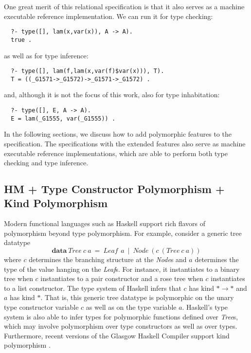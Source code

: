 \documentclass[runningheads,a4paper]{llncs}
\begin{document}
One great merit of this relational specification is that it also serves as
a machine executable reference implementation. We can run it
for type checking: {\small \vspace*{-1ex}
\begin{verbatim}
  ?- type([], lam(x,var(x)), A -> A).         
  true .
\end{verbatim} \vspace*{-.7ex} }\noindent
as well as for type inference: {\small \vspace*{-1ex}
\begin{verbatim}
  ?- type([], lam(f,lam(x,var(f)$var(x))), T).
  T = ((_G1571->_G1572)->_G1571->_G1572) .
\end{verbatim} \vspace*{-.7ex} }\noindent
and, although it is not the focus of this work,
also for type inhabitation: {\small \vspace*{-1ex}
\begin{verbatim}
  ?- type([], E, A -> A).
  E = lam(_G1555, var(_G1555)) .
\end{verbatim} \vspace*{-.7ex} }

In the following sections, we discuss how to add polymorphic features
to the specification. The specifications with the extended features
also serve as machine executable reference implementations, which
are able to perform both type checking and type inference.





\subsection{HM + Type Constructor Polymorphism + Kind Polymorphism}
\label{ssec:HMtck}
Modern functional languages such as Haskell support rich flavors of
polymorphism beyond type polymorphism. For example, consider
a generic tree datatype
\[ \textbf{data}~\textit{Tree}~c~a
  ~=~ \textit{Leaf}\,~a ~\mid~ \textit{Node}~(c~(\textit{Tree}~c~a)) \]
where $c$ determines the branching structure at the \textit{Node}s and $a$
determines the type of the value hanging on the \textit{Leaf}s. For instance,
it instantiates to a binary tree when $c$ instantiates to a pair constructor
and a rose tree when $c$ instantiates to a list constructor.
The type system of Haskell infers that $c$ has kind $*\to*$ and
$a$ has kind $*$. That is, this generic tree datatype is polymorphic on
the unary type constructor variable $c$ as well as on the type variable $a$.
Haskell's type system is also able to infer types for polymorphic functions
defined over \textit{Tree}s, which may involve polymorphism over
type constructors as well as over types. Furthermore, recent versions of the
Glasgow Haskell Compiler support kind polymorphism \cite{GPH2012}.
\end{document}
